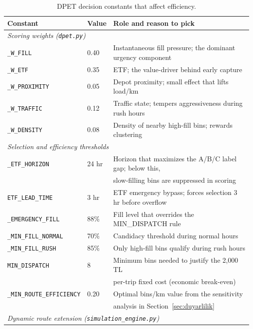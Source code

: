 \documentclass[12pt,a4paper]{report}
\begin{document}
\begin{table}[H]
\centering
\caption{DPET decision constants that affect efficiency.}
\label{tab:dpet_constants}
\small
\begin{tabular}{lll}
\toprule
\textbf{Constant} & \textbf{Value} & \textbf{Role and reason to pick} \\
\midrule
\multicolumn{3}{l}{\textit{Scoring weights (\texttt{dpet.py})}} \\
\texttt{\_W\_FILL}            & 0.40 & Instantaneous fill pressure; the dominant urgency component \\
\texttt{\_W\_ETF}             & 0.35 & ETF; the value-driver behind early capture \\
\texttt{\_W\_PROXIMITY}       & 0.05 & Depot proximity; small effect that lifts load/km \\
\texttt{\_W\_TRAFFIC}         & 0.12 & Traffic state; tempers aggressiveness during rush hours \\
\texttt{\_W\_DENSITY}         & 0.08 & Density of nearby high-fill bins; rewards clustering \\
\midrule
\multicolumn{3}{l}{\textit{Selection and efficiency thresholds}} \\
\texttt{\_ETF\_HORIZON}       & 24 hr & Horizon that maximizes the A/B/C label gap; below this, \\
                              &       & slow-filling bins are suppressed in scoring \\
\texttt{ETF\_LEAD\_TIME}      & 3 hr  & ETF emergency bypass; forces selection 3 hr before overflow \\
\texttt{\_EMERGENCY\_FILL}    & 88\%  & Fill level that overrides the MIN\_DISPATCH rule \\
\texttt{\_MIN\_FILL\_NORMAL}  & 70\%  & Candidacy threshold during normal hours \\
\texttt{\_MIN\_FILL\_RUSH}    & 85\%  & Only high-fill bins qualify during rush hours \\
\texttt{MIN\_DISPATCH}        & 8     & Minimum bins needed to justify the 2,000 TL \\
                              &       & per-trip fixed cost (economic break-even) \\
\texttt{\_MIN\_ROUTE\_EFFICIENCY} & 0.20 & Optimal bins/km value from the sensitivity \\
                              &        & analysis in Section~\ref{sec:duyarlilik} \\
\midrule
\multicolumn{3}{l}{\textit{Dynamic route extension (\texttt{simulation\_engine.py})}} \\

\end{tabular}
\end{table}
\end{document}
